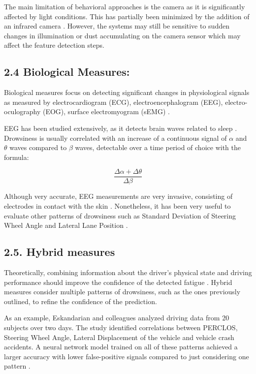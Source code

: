 \documentclass[12pt]{extarticle}
\begin{document}
The main limitation of behavioral approaches is the camera as it is
significantly affected by light conditions. This has partially been
minimized by the addition of an infrared camera
\cite{sahayadhas_detecting_2012}. However, the systems may still be
sensitive to sudden changes in illumination or dust accumulating on the
camera sensor which may affect the feature detection steps.

\hypertarget{biological-measures}{%
\subsection{2.4 Biological Measures:}\label{biological-measures}}

Biological measures focus on detecting significant changes in
physiological signals as measured by electrocardiogram (ECG),
electroencephalogram (EEG), electro-oculography (EOG), surface
electromyogram (sEMG) \cite{dong_driver_2011}.

EEG has been studied extensively, as it detects brain waves related to
sleep \cite{qiong_wang_driver_2006}. Drowsiness is usually correlated
with an increase of a continuous signal of \(\alpha\) and \(\theta\)
waves compared to \(\beta\) waves, detectable over a time period of choice with the formula:

\[ \dfrac{\Delta \alpha + \Delta \theta}{\Delta \beta} \]

Although very accurate, EEG measurements are very invasive, consisting
of electrodes in contact with the skin \cite{dong_driver_2011}.
Nonetheless, it has been very useful to evaluate other patterns of
drowsiness such as Standard Deviation of Steering Wheel Angle and
Lateral Lane Position \cite{boyle_driver_2008}.

\hypertarget{hybrid-measures}{%
\subsection{2.5. Hybrid measures}\label{hybrid-measures}}

Theoretically, combining information about the driver's physical state
and driving performance should improve the confidence of the detected
fatigue \cite{dong_driver_2011}. Hybrid measures consider multiple
patterns of drowsiness, such as the ones previously outlined, to refine
the confidence of the prediction.

As an example, Eskandarian and colleagues analyzed driving data from 20
subjects over two days. The study identified correlations between
PERCLOS, Steering Wheel Angle, Lateral Displacement of the vehicle and
vehicle crash accidents. A neural network model trained on all of these
patterns achieved a larger accuracy with lower false-positive signals
compared to just considering one pattern \cite{eskandarian_evaluation_2007}.
\end{document}
